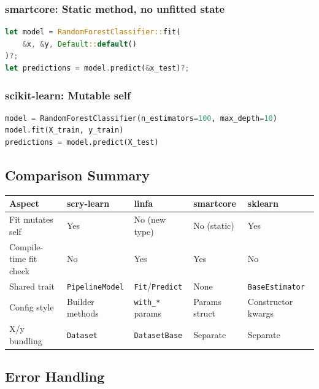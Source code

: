 \documentclass[11pt,a4paper]{article}
\begin{document}
\subsubsection*{smartcore: Static method, no unfitted state}

\begin{lstlisting}[language=Rust]
let model = RandomForestClassifier::fit(
    &x, &y, Default::default()
)?;
let predictions = model.predict(&x_test)?;
\end{lstlisting}

\subsubsection*{scikit-learn: Mutable self}

\begin{lstlisting}[language=Python]
model = RandomForestClassifier(n_estimators=100, max_depth=10)
model.fit(X_train, y_train)
predictions = model.predict(X_test)
\end{lstlisting}

\subsection{Comparison Summary}

\begin{center}
\begin{tabular}{lllll}
\toprule
\textbf{Aspect} & \textbf{scry-learn} & \textbf{linfa} & \textbf{smartcore} & \textbf{sklearn} \\
\midrule
Fit mutates self & Yes & No (new type) & No (static) & Yes \\
Compile-time fit check & No & Yes & Yes & No \\
Shared trait & \texttt{PipelineModel} & \texttt{Fit}/\texttt{Predict} & None & \texttt{BaseEstimator} \\
Config style & Builder methods & \texttt{with\_*} params & Params struct & Constructor kwargs \\
X/y bundling & \texttt{Dataset} & \texttt{DatasetBase} & Separate & Separate \\
\bottomrule
\end{tabular}
\end{center}

\subsection{Error Handling}
\end{document}

